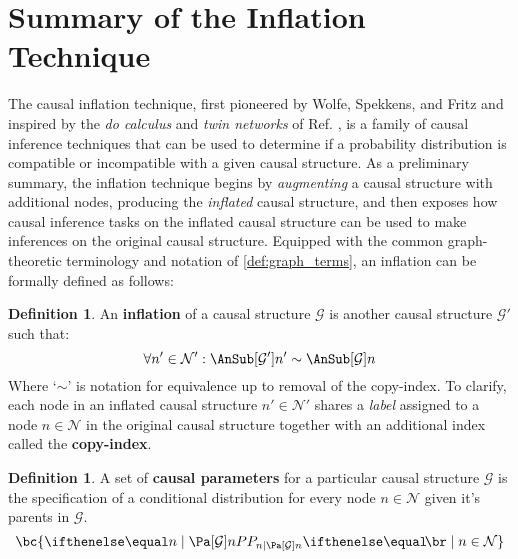 \documentclass[aps, 10pt, english, twoside, pra, nofootinbib, longbibliography]{revtex4-1}
\theoremstyle{plain}
\theoremstyle{definition}
\newtheorem{definition}[theorem]{Definition}
\theoremstyle{remark}
\newcommand{\graph}{\mathcal{G}}
\newcommand{\nodes}{\mathcal{N}}
\newcommand{\term}[1]{\textcolor{Mahogany}{\textbf{#1}}}
\begin{document}
    \section{Summary of the Inflation Technique}
    The causal inflation technique, first pioneered by Wolfe, Spekkens, and Fritz \cite{Inflation} and inspired by the \textit{do calculus} and \textit{twin networks} of Ref. \cite{Pearl_2009}, is a family of causal inference techniques that can be used to determine if a probability distribution is compatible or incompatible with a given causal structure. As a preliminary summary, the inflation technique begins by \textit{augmenting} a causal structure with additional nodes, producing the \textit{inflated} causal structure, and then exposes how causal inference tasks on the inflated causal structure can be used to make inferences on the original causal structure. Equipped with the common graph-theoretic terminology and notation of \cref{def:graph_terms}, an inflation can be formally defined as follows:
    \begin{definition}
        An \term{inflation} of a causal structure $\graph$ is another causal structure $\graph'$ such that:
        \[ \forall n' \in \nodes' : \AnSub[\graph']{n'} \sim \AnSub[\graph]{n} \]
        Where `$\sim$' is notation for equivalence up to removal of the copy-index. To clarify, each node in an inflated causal structure $n' \in \nodes'$ shares a \textit{label} assigned to a node $n \in \nodes$ in the original causal structure together with an additional index called the \term{copy-index}.
    \end{definition}
    \begin{definition}
        A set of \term{causal parameters} for a particular causal structure $\graph$ is the specification of a conditional distribution for every node $n \in \nodes$ given it's parents in $\graph$.
        \[ \bc{\prob[n \mid \Pa[\graph]{n}] \mid n \in \nodes} \]
    \end{definition}
\end{document}
